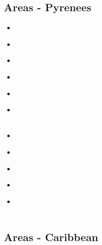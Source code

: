 \subsection{Areas - Pyrenees} 

\begin{scriptsize}
\begin{itemize}
\item[\nineteenninetyone]   
\textcite{chvd91}  \\
\item[\nineteenninetytwo]   
\textcite{chou92}  \\
\item[\nineteenninetythree] 
\textcite{qubh93}  \\
\item[\nineteenninetyeight]
\textcite{giju98}  \\
\item[\twothousand]         
\textcite{bemh00}  \\
\item[\twothousandfour] 
\textcite{mcmg04}  \\
\textcite{siss04} \\
\item[\twothousandten] 
\textcite{jaml10} \\
\item[\twothousandtwelve] 
\textcite{vime12} \\
\item[\twothousandthirteen] 
\textcite{fihv13b} \\
\item[\twothousandfourteen] 
\textcite{jahm14} \\
\item[\twothousandnineteen] 
\textcite{dual19} \\
\textcite{jolm19} \\
\end{itemize}
\end{scriptsize}

\subsection{Areas - Caribbean} 

